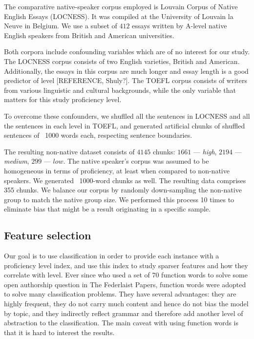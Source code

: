 \documentclass[11pt]{article}
\begin{document}
The comparative native-speaker corpus employed is Louvain Corpus of Native English Essays (LOCNESS). It was compiled at the University of Louvain la Neuve in Belgium. We use a subset of $412$ essays written by A-level native English speakers from British and American universities. 

Both corpora include confounding variables which are of no interest for our study. The LOCNESS corpus consists of two English varieties, British and American. Additionally, the essays in this corpus are much longer and essay length is a good predictor of level [REFERENCE, Shuly?]. The TOEFL corpus consists of writers from various linguistic and cultural backgrounds, while the only variable  that matters for this study proficiency level.

To overcome these confounders, we shuflled all the sentences in LOCNESS and all the sentences in each level in TOEFL, and generated artificial chunks of shuffled sentences of ~1000 words each, respecting sentence boundaries. 

The resulting non-native dataset consists of $4145$ chunks: $1661$ --- \emph{high}, $2194$ --- \emph{medium}, $299$ --- $low$. The native speaker's corpus was assumed to be homogeneous in terms of proficiency, at least when compared to non-native speakers. We generated ~1000-word chunks as well. The resulting data comprises 355 chunks. We balance our corpus by randomly down-sampling the non-native group to match the native group size. We performed this process 10 times to eliminate bias that might be a result originating in a specific sample.


\subsection{Feature selection}
Our goal is to use classification in order to provide each instance with a proficiency level index, and use this index to study sparser features and how they correlate with level. Ever since \citep{mosteller1963inference} who used a set of 70 function words to solve some open authorship question in The Federlaist Papers, function words were adopted to solve many classification problems. They have several advantages: they are highly frequent, they do not carry much content and hence do not bias the model by topic, and they indirectly reflect grammar and therefore add another level of abstraction to the classification. The main caveat with using function words is that it is hard to interest the results. 
\end{document}
